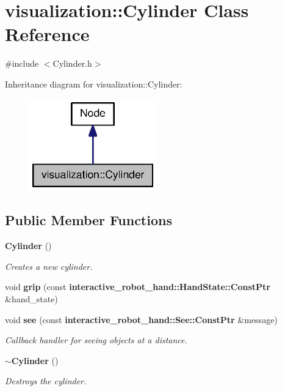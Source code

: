 \section{visualization\-:\-:Cylinder Class Reference}
\label{classvisualization_1_1Cylinder}


{\ttfamily \#include $<$Cylinder.\-h$>$}



Inheritance diagram for visualization\-:\-:Cylinder\-:\nopagebreak
\begin{figure}[H]
\begin{center}
\leavevmode
\includegraphics[width=156pt]{classvisualization_1_1Cylinder__inherit__graph}
\end{center}
\end{figure}
\subsection*{Public Member Functions}
\begin{DoxyCompactItemize}
\item 
{\bf Cylinder} ()
\begin{DoxyCompactList}\small\item\em Creates a new cylinder. \end{DoxyCompactList}\item 
void {\bf grip} (const {\bf interactive\-\_\-robot\-\_\-hand\-::\-Hand\-State\-::\-Const\-Ptr} \&hand\-\_\-state)
\item 
void {\bf see} (const {\bf interactive\-\_\-robot\-\_\-hand\-::\-See\-::\-Const\-Ptr} \&message)
\begin{DoxyCompactList}\small\item\em Callback handler for seeing objects at a distance. \end{DoxyCompactList}\item 
{\bf $\sim$\-Cylinder} ()
\begin{DoxyCompactList}\small\item\em Destroys the cylinder. \end{DoxyCompactList}\end{DoxyCompactItemize}
